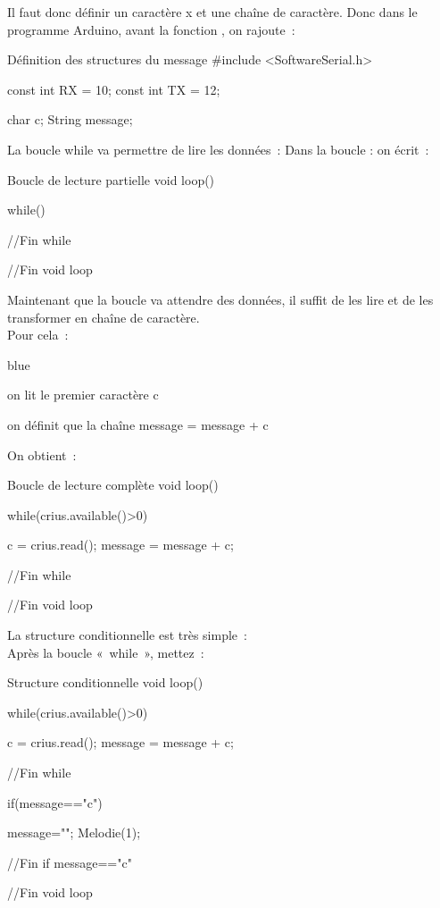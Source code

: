 Il faut donc définir un caractère x et une chaîne de caractère.
Donc dans le programme Arduino, avant la fonction , on rajoute :

\begin{Cpp}{Définition des structures du message}
#include <SoftwareSerial.h>

const int RX = 10;
const int TX = 12;

char c;
String message;

\end{Cpp}

La boucle while va permettre de lire les données : 
Dans la boucle  : on écrit :

\begin{Cpp}{Boucle de lecture partielle}
 void loop() {
 
    while() {
    
    }//Fin while

 }//Fin void loop

\end{Cpp}

Maintenant que la boucle va attendre des données, il suffit de les lire et de les transformer en chaîne de caractère. \\
Pour cela : \\

\begin{items}{blue}{\Triangle}
    \item on lit le premier caractère c
    \item on définit que la chaîne message = message + c 
\end{items}
On obtient :

\begin{Cpp}{Boucle de lecture complète}
 void loop() {
 
    while(crius.available()>0) {
    
        c = crius.read();
        message = message + c;
    }//Fin while

 }//Fin void loop

\end{Cpp}

La structure conditionnelle est très simple : \\
Après la boucle « while », mettez : \\

\begin{Cpp}{Structure conditionnelle}
 void loop() {
 
    while(crius.available()>0) {
    
        c = crius.read();
        message = message + c;
    }//Fin while
    
    if(message=="c") {
    
        message="";
        Melodie(1);
    }//Fin if message=="c"

 }//Fin void loop

\end{Cpp}

